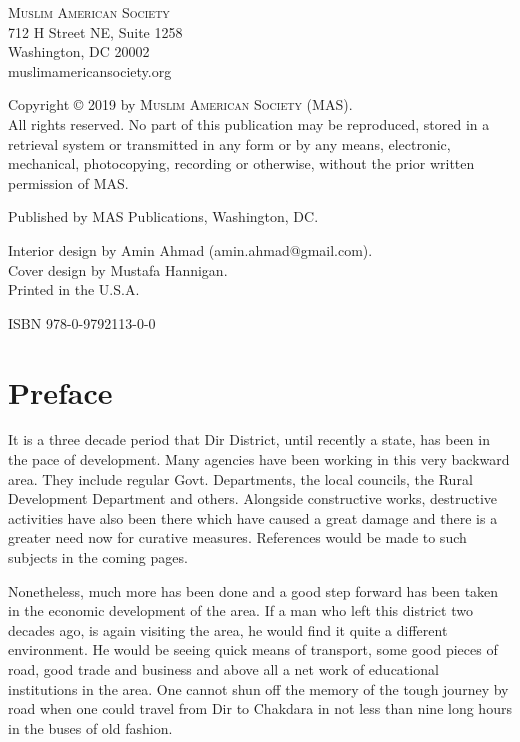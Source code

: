 \documentclass[twoside,openright]{book}
\begin{document}
\begin{titlingpage}
\let\cleardoublepage\clearpage
\vspace*{\fill}

\noindent \textsc{Muslim American Society} \\
712 H Street NE, Suite 1258 \\
Washington, DC 20002 \\
{\emailfont muslimamericansociety.org}

\vspace{12mm}

\small{
\noindent Copyright © 2019 by \textsc{Muslim American Society (MAS)}. \\
All rights reserved. No part of this publication may be reproduced, stored in a
retrieval system or transmitted in any form or by any means, electronic,
mechanical, photocopying, recording or otherwise, without the prior written
permission of MAS.

\vspace{3mm}
\noindent Published by MAS Publications, Washington, DC.
\vspace{5mm}

\noindent Interior design by Amin Ahmad ({\emailfont amin.ahmad@gmail.com}). \\
Cover design by Mustafa Hannigan. \\
Printed in the U.S.A. \\
\vspace{2mm}

\noindent ISBN 978-0-9792113-0-0
}
\end{titlingpage}

\setcounter{page}{3}
\tableofcontents

\mainmatter
\chapter{Preface}

It is a three decade period that Dir District, until recently a state, has been
in the pace of development. Many agencies have been working in this very
backward area. They include regular Govt. Departments, the local councils, the
Rural Development Department and others. Alongside constructive works,
destructive activities have also been there which have caused a great damage and
there is a greater need now for curative measures. References would be made to
such subjects in the coming pages.

Nonetheless, much more has been done and a good step forward has been taken in
the economic development of the area. If a man who left this district two
decades ago, is again visiting the area, he would find it quite a different
environment. He would be seeing quick means of transport, some good pieces of
road, good trade and business and above all a net work of educational
institutions in the area. One cannot shun off the memory of the tough journey by
road when one could travel from Dir to Chakdara in not less than nine long hours
in the buses of old fashion.
\end{document}
